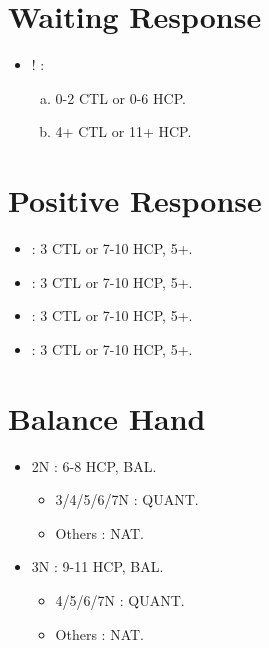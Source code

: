 \documentclass[12pt,twoside,a5paper]{report}%
\begin{document}
	\section*{Waiting Response}
		\begin{itemize}
		\renewcommand{\labelitemi}{}
			\item {}! : 
				\begin{enumerate}[(a)]
				\item 0-2 CTL or 0-6 HCP.
				\item 4+ CTL or 11+ HCP.
				\end{enumerate}
		\end{itemize}

	\section*{Positive Response}
		\begin{itemize}
		\renewcommand{\labelitemi}{}
			\item {} : 3 CTL or 7-10 HCP, 5+\he{}.
			\item {} : 3 CTL or 7-10 HCP, 5+\sp{}.
			\item {} : 3 CTL or 7-10 HCP, 5+\cl{}.
			\item {} : 3 CTL or 7-10 HCP, 5+\di{}.
		\end{itemize}

	\section*{Balance Hand}
		\begin{itemize}
		\renewcommand{\labelitemi}{}
			\item 2N : 6-8 HCP, BAL.
				\begin{itemize}
				\renewcommand{\labelitemi}{--}
					\item 3/4/5/6/7N : QUANT.
					\item Others : NAT.
				\end{itemize}
			\item 3N : 9-11 HCP, BAL.
				\begin{itemize}
				\renewcommand{\labelitemi}{--}
					\item 4/5/6/7N : QUANT.
					\item Others : NAT.
				\end{itemize}
		\end{itemize}
\end{document}
